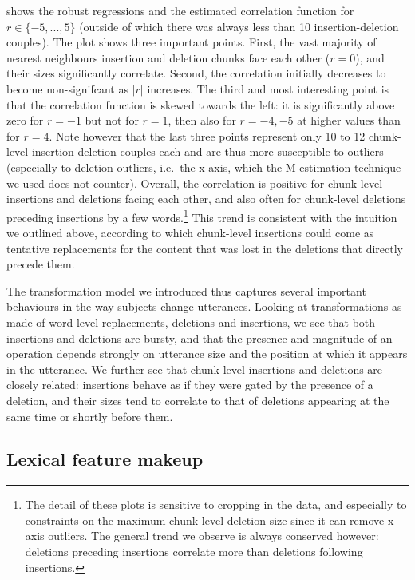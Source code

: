  shows the robust regressions and
the estimated correlation function for \(r \in \{ -5, ..., 5 \}\)
(outside of which there was always less than 10 insertion-deletion
couples). The plot shows three important points. First, the vast
majority of nearest neighbours insertion and deletion chunks face each
other (\(r = 0\)), and their sizes significantly correlate. Second, the
correlation initially decreases to become non-signifcant as \(|r|\)
increases. The third and most interesting point is that the correlation
function is skewed towards the left: it is significantly above zero for
\(r = -1\) but not for \(r = 1\), then also for \(r = -4, -5\) at higher
values than for \(r = 4\). Note however that the last three points
represent only 10 to 12 chunk-level insertion-deletion couples each and
are thus more susceptible to outliers (especially to deletion outliers,
i.e.~the x axis, which the M-estimation technique we used does not
counter). Overall, the correlation is positive for chunk-level
insertions and deletions facing each other, and also often for
chunk-level deletions preceding insertions by a few words.\footnote{The
  detail of these plots is sensitive to cropping in the data, and
  especially to constraints on the maximum chunk-level deletion size
  since it can remove x-axis outliers. The general trend we observe is
  always conserved however: deletions preceding insertions correlate
  more than deletions following insertions.} This trend is consistent
with the intuition we outlined above, according to which chunk-level
insertions could come as tentative replacements for the content that was
lost in the deletions that directly precede them.

\bigskip
The transformation model we introduced thus captures several important
behaviours in the way subjects change utterances. Looking at
transformations as made of word-level replacements, deletions and
insertions, we see that both insertions and deletions are bursty, and
that the presence and magnitude of an operation depends strongly on
utterance size and the position at which it appears in the utterance. We
further see that chunk-level insertions and deletions are closely
related: insertions behave as if they were gated by the presence of a
deletion, and their sizes tend to correlate to that of deletions
appearing at the same time or shortly before them.

\subsection{Lexical feature makeup}\label{lexical-feature-makeup}

